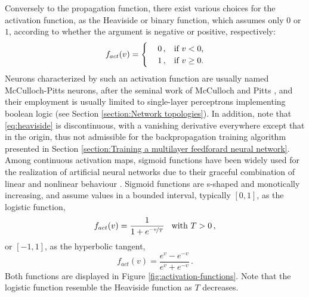\documentclass[12pt, a4paper, twoside, openright]{report}
\numberwithin{equation}{chapter}
\theoremstyle{theorem}
\theoremstyle{definition}
\theoremstyle{remark}
\theoremstyle{proposition}
\numberwithin{figure}{chapter}
\begin{document}
		Conversely to the propagation function, there exist various choices for the activation function, as the Heaviside or binary function, which assumes only $0$ or $1$, according to whether the argument is negative or positive, respectively:
		\begin{equation}
			\label{eq:heaviside}
			f_{act}(v) = 
			\begin{cases}
				& 0 \, , \hspace*{0.3cm} \text{if $v < 0$,} \\
				& 1 \, , \hspace*{0.3cm} \text{if $v \geq 0$.}
			\end{cases}
		\end{equation}
		Neurons characterized by such an activation function are usually named McCulloch-Pitts neurons, after the seminal work of McCulloch and Pitts \cite{Hay05}, and their employment is usually limited to single-layer perceptrons implementing boolean logic (see Section \ref{section:Network topologies}). In addition, note that \eqref{eq:heaviside} is discontinuous, with a vanishing derivative everywhere except that in the origin, thus not admissible for the backpropagation training algorithm presented in Section \ref{section:Training a multilayer feedforard neural network}. \\
		Among continuous activation maps, sigmoid functions have been widely used for the realization of artificial neural networks due to their graceful combination of linear and nonlinear behaviour \cite{Hay05}. Sigmoid functions are s-shaped and monotically increasing, and assume values in a bounded interval, typically $[0,1]$, as the logistic function,
		\begin{equation}
			\label{eq:logistic}
			f_{act}(v) = \dfrac{1}{1 + e^{\nicefrac{-v}{T}}} \hspace*{0.3cm} \text{with $T > 0$} \, ,
		\end{equation}
		or $[-1,1]$, as the hyperbolic tangent,
		\begin{equation}
			\label{eq:hyperbolic-tangent}
			f_{act}(v) = \dfrac{e^{v} - e^{-v}}{e^v + e^{-v}} \, .
		\end{equation}
		Both functions are displayed in Figure \ref{fig:activation-functions}. Note that the logistic function resemble the Heaviside function as $T$ decreases.
		
		\vspace*{0.3cm}
		
\end{document}
